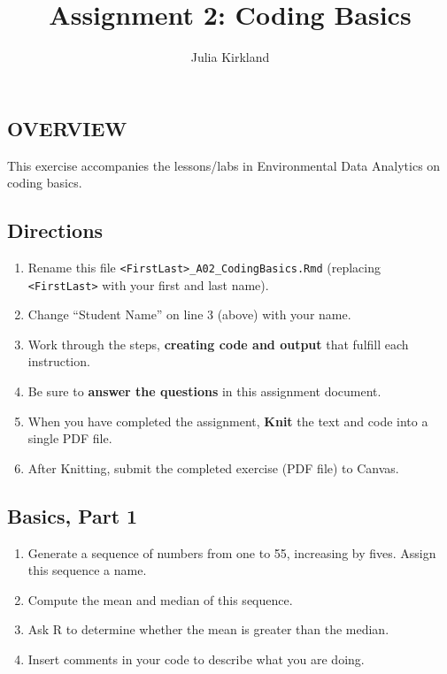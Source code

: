 \documentclass[
]{article}
\title{Assignment 2: Coding Basics}
\author{Julia Kirkland}
\date{}
\providecommand{\tightlist}{%
  \setlength{\itemsep}{0pt}\setlength{\parskip}{0pt}}
\begin{document}
\maketitle

\subsection{OVERVIEW}\label{overview}

This exercise accompanies the lessons/labs in Environmental Data
Analytics on coding basics.

\subsection{Directions}\label{directions}

\begin{enumerate}
\def\labelenumi{\arabic{enumi}.}
\tightlist
\item
  Rename this file
  \texttt{\textless{}FirstLast\textgreater{}\_A02\_CodingBasics.Rmd}
  (replacing \texttt{\textless{}FirstLast\textgreater{}} with your first
  and last name).
\item
  Change ``Student Name'' on line 3 (above) with your name.
\item
  Work through the steps, \textbf{creating code and output} that fulfill
  each instruction.
\item
  Be sure to \textbf{answer the questions} in this assignment document.
\item
  When you have completed the assignment, \textbf{Knit} the text and
  code into a single PDF file.
\item
  After Knitting, submit the completed exercise (PDF file) to Canvas.
\end{enumerate}

\subsection{Basics, Part 1}\label{basics-part-1}

\begin{enumerate}
\def\labelenumi{\arabic{enumi}.}
\item
  Generate a sequence of numbers from one to 55, increasing by fives.
  Assign this sequence a name.
\item
  Compute the mean and median of this sequence.
\item
  Ask R to determine whether the mean is greater than the median.
\item
  Insert comments in your code to describe what you are doing.
\end{enumerate}
\end{document}
